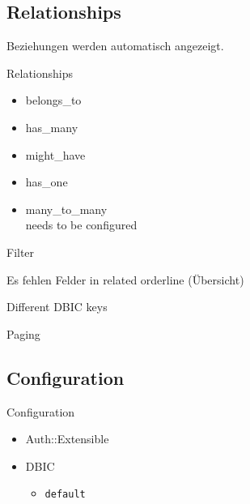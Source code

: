 \subsection{Relationships}

Beziehungen werden automatisch angezeigt.

\begin{frame}{Relationships}
\begin{itemize}
\item belongs\_to
\item has\_many
\item might\_have
\item has\_one
\item many\_to\_many \\
      needs to be configured
\end{itemize}
\end{frame}

Filter

Es fehlen Felder in related orderline (Übersicht)

Different DBIC keys

Paging


\subsection{Configuration}
\begin{frame}[fragile]{Configuration}
\begin{itemize}
\item Auth::Extensible
\item DBIC
\begin{itemize}
\item \verb|default|
\end{itemize}
\end{itemize}
\end{frame}

